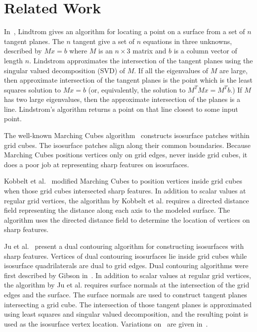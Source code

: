 

\section{Related Work}
\label{section:related}

In~\cite{l-oslpm-00}, Lindtrom gives an algorithm for locating a point on a surface from a set of $n$ tangent planes.
The $n$ tangent give a set of $n$ equations in three unknowns,
described by $M x = b$ where $M$ is an $n \times 3$ matrix and $b$ is a column vector of length $n$.
Lindstrom approximates the intersection of the tangent planes using the singular valued decomposition (SVD) of $M$.
If all the eigenvalues of $M$ are large,
then approximate intersection of the tangent planes is the point
which is the least squares solution to $M x = b$
(or, equivalently, the solution to $M^T M x = M^T b$.)
If $M$ has two large eigenvalues, then the approximate intersection of the planes is a line.
Lindstrom's algorithm returns a point on that line closest to some input point.

The well-known Marching Cubes algorithm~\cite{lc-mchr3-87}
constructs isosurface patches within grid cubes.
The isosurface patches align along their common boundaries.
Because Marching Cubes positions vertices only on grid edges,
never inside grid cubes,
it does a poor job at representing sharp features on isosurfaces.

Kobbelt et al.~\cite{kbsh-fssev-01} modified Marching Cubes 
to position vertices inside grid cubes when those grid cubes
intersected sharp features.
In addition to scalar values at regular grid vertices,
the algorithm by Kobbelt et al. requires a directed distance field
representing the distance along each axis to the modeled surface.
The algorithm uses the directed distance field to determine
the location of vertices on sharp features.

Ju et al.~\cite{jlsw-dchd-02,sw-dcss-02} present a dual contouring algorithm
for constructing isosurfaces with sharp features.
Vertices of dual contouring isosurfaces lie inside grid cubes
while isosurface quadrilaterals are dual to grid edges.
Dual contouring algorithms were first described
by Gibson in~\cite{gh-ssqem-97,g-cesng-98}.
In addition to scalar values at regular grid vertices,
the algorithm by Ju et al. requires surface normals
at the intersection of the grid edges and the surface.
The surface normals are used to construct tangent planes
intersecting a grid cube.
The intersection of those tangent planes is approximated 
using least squares and singular valued decomposition,
and the resulting point is used as the isosurface vertex location.
Variations on~\cite{jlsw-dchd-02} are given 
in~\cite{zhk-dctps-04,Varadhan:2003:fss}.

